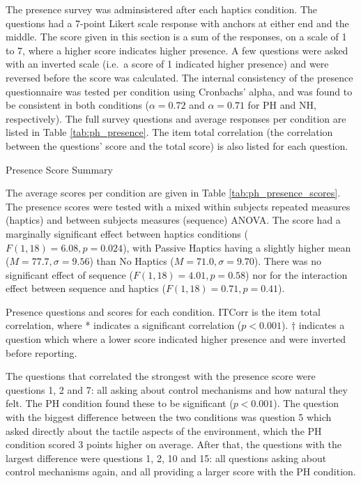 The presence survey was adminsistered after each haptics condition.
The questions had a 7-point Likert scale response with anchors at either end and the middle.
The score given in this section is a sum of the responses, on a scale of 1 to 7, where a higher score indicates higher presence.
A few questions were asked with an inverted scale (i.e.\ a score of 1 indicated higher presence) and were reversed before the score was calculated.
The internal consistency of the presence questionnaire was tested per condition using Cronbachs' alpha, and was found to be consistent in both conditions ($\alpha=0.72$ and $\alpha=0.71$ for PH and NH, respectively).
The full survey questions and average responses per condition are listed in Table \ref{tab:ph_presence}.
The item total correlation (the correlation between the questions' score and the total score) is also listed for each question.

\begin{table}
    \centering
    \caption{Presence Score Summary}
    \label{tab:ph_presence_scores}
\end{table}

The average scores per condition are given in Table \ref{tab:ph_presence_scores}.
The presence scores were tested with a mixed within subjects repeated measures (haptics) and between subjects measures (sequence) ANOVA.
The score had a marginally significant effect between haptics conditions ($F(1,18)=6.08, p=0.024$), with Passive Haptics having a slightly higher mean ($M=77.7, \sigma=9.56$) than No Haptics ($M=71.0, \sigma=9.70$).
There was no significant effect of sequence ($F(1,18)=4.01, p=0.58$) nor for the interaction effect between sequence and haptics ($F(1,18)=0.71, p=0.41$).

\begin{table}
    \centering
    \caption{Presence questions and scores for each condition. ITCorr is the item total correlation, where * indicates a significant correlation ($p<0.001$). $\dagger$ indicates a question which where a lower score indicated higher presence and were inverted before reporting.}
    \label{tab:ph_presence}
\end{table}

The questions that correlated the strongest with the presence score were questions 1, 2 and 7: all asking about control mechanisms and how natural they felt.
The PH condition found these to be significant ($p<0.001$).
The question with the biggest difference between the two conditions was question 5 which asked directly about the tactile aspects of the environment, which the PH condition scored 3 points higher on average.
After that, the questions with the largest difference were questions 1, 2, 10 and 15: all questions asking about control mechanisms again, and all providing a larger score with the PH condition.

